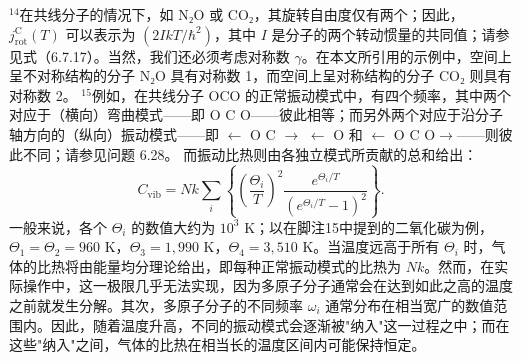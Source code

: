 \(^{14}\)在共线分子的情况下，如 N₂O 或 CO₂，其旋转自由度仅有两个；因此，\(j_{\mathrm{rot}}^{\mathrm{C}}(T)\) 可以表示为 \((2IkT/\hbar^{2})\)，其中 \(I\) 是分子的两个转动惯量的共同值；请参见式（6.7.17）。当然，我们还必须考虑对称数 \(\gamma\)。在本文所引用的示例中，空间上呈不对称结构的分子 N₂O 具有对称数 1，而空间上呈对称结构的分子 CO₂ 则具有对称数 2。
\(^{15}\)例如，在共线分子 OCO 的正常振动模式中，有四个频率，其中两个对应于（横向）弯曲模式——即 O C O——彼此相等；而另外两个对应于沿分子轴方向的（纵向）振动模式——即 \(\leftarrow\) O C \(\rightarrow\) \(\leftarrow\) O 和 \(\leftarrow\) O C O\(\rightarrow\)——则彼此不同；请参见问题 6.28。
而振动比热则由各独立模式所贡献的总和给出：
\begin{equation}\tag{6.5.46}\label{eq:6.5.46}
C _ { \mathrm { v i b } } = N k \sum _ { i } \left\{ \left( \frac { \Theta _ { i } } { T } \right) ^{2} \frac { e ^{\Theta _ { i} / T } } { \left( e ^{\Theta _ { i} / T } - 1 \right) ^{2} } \right\} .
\end{equation}
一般来说，各个 \(\Theta_{i}\) 的数值大约为 \(10^{3}\) K；以在脚注15中提到的二氧化碳为例，\(\Theta_{1}=\Theta_{2}=960\) K，\(\Theta_{3}=1,990\) K，\(\Theta_{4}=3,510\) K。当温度远高于所有 \(\Theta_{i}\) 时，气体的比热将由能量均分理论给出，即每种正常振动模式的比热为 \(Nk\)。然而，在实际操作中，这一极限几乎无法实现，因为多原子分子通常会在达到如此之高的温度之前就发生分解。其次，多原子分子的不同频率 \(\omega_{i}\) 通常分布在相当宽广的数值范围内。因此，随着温度升高，不同的振动模式会逐渐被"纳入"这一过程之中；而在这些"纳入"之间，气体的比热在相当长的温度区间内可能保持恒定。
